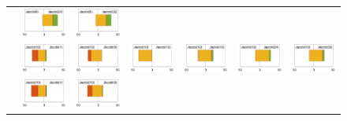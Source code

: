\begin{landscape}
\begin{figure}
\begin{center}
{\begin{tabular}{c|cccccc}
&
\includegraphics[width=.135\columnwidth]{plots/Jacobi(8)_vs_Jacobi(24).pdf}
&
\includegraphics[width=.135\columnwidth]{plots/Jacobi(8)_vs_Jacobi(32).pdf}
\\
&
\includegraphics[width=.135\columnwidth]{plots/Jacobi(12)_vs_Jacobi(1).pdf}
&
\includegraphics[width=.135\columnwidth]{plots/Jacobi(12)_vs_Jacobi(8).pdf}
&
\includegraphics[width=.135\columnwidth]{plots/Jacobi(12)_vs_Jacobi(12).pdf}
&
\includegraphics[width=.135\columnwidth]{plots/Jacobi(12)_vs_Jacobi(16).pdf}
&
\includegraphics[width=.135\columnwidth]{plots/Jacobi(12)_vs_Jacobi(24).pdf}
&
\includegraphics[width=.135\columnwidth]{plots/Jacobi(12)_vs_Jacobi(32).pdf}
\\
&
\includegraphics[width=.135\columnwidth]{plots/Jacobi(16)_vs_Jacobi(1).pdf}
&
\includegraphics[width=.135\columnwidth]{plots/Jacobi(16)_vs_Jacobi(8).pdf}

\end{tabular}}
\end{center}
\end{figure}
\end{landscape}
